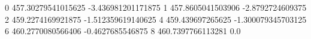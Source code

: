 0 457.30279541015625 -3.436981201171875
1 457.8605041503906 -2.8792724609375
2 459.2274169921875 -1.512359619140625
4 459.439697265625 -1.300079345703125
6 460.2770080566406 -0.4627685546875
8 460.7397766113281 0.0
